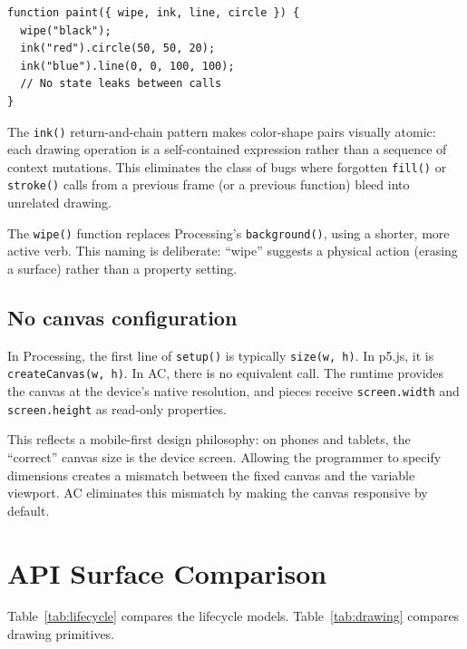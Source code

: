 \documentclass[10pt,letterpaper,twocolumn]{article}
\begin{document}
\begin{lstlisting}[style=acjsstyle]
function paint({ wipe, ink, line, circle }) {
  wipe("black");
  ink("red").circle(50, 50, 20);
  ink("blue").line(0, 0, 100, 100);
  // No state leaks between calls
}
\end{lstlisting}

The \texttt{ink()} return-and-chain pattern makes color-shape pairs visually atomic: each drawing operation is a self-contained expression rather than a sequence of context mutations. This eliminates the class of bugs where forgotten \texttt{fill()} or \texttt{stroke()} calls from a previous frame (or a previous function) bleed into unrelated drawing.

The \texttt{wipe()} function replaces Processing's \texttt{background()}, using a shorter, more active verb. This naming is deliberate: ``wipe'' suggests a physical action (erasing a surface) rather than a property setting.

\subsection{No canvas configuration}

In Processing, the first line of \texttt{setup()} is typically \texttt{size(w, h)}. In p5.js, it is \texttt{createCanvas(w, h)}. In AC, there is no equivalent call. The runtime provides the canvas at the device's native resolution, and pieces receive \texttt{screen.width} and \texttt{screen.height} as read-only properties.

This reflects a mobile-first design philosophy: on phones and tablets, the ``correct'' canvas size is the device screen. Allowing the programmer to specify dimensions creates a mismatch between the fixed canvas and the variable viewport. AC eliminates this mismatch by making the canvas responsive by default.


\section{API Surface Comparison}
\label{sec:comparison}

Table~\ref{tab:lifecycle} compares the lifecycle models. Table~\ref{tab:drawing} compares drawing primitives.
\end{document}
